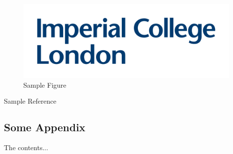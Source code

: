 \documentclass[a4paper]{article}
\begin{document}

\newpage

\printbibliography[
heading=bibintoc,
title={References}
]


\begin{figure}[H]
\centering
\includegraphics[scale=0.18]{logo.png}
\caption{Sample Figure}
\label{fig:image1}
\end{figure}

Sample Reference\cite{einstein}


\begin{appendices}
\chapter{Some Appendix}
The contents...
\end{appendices}
\end{document}
